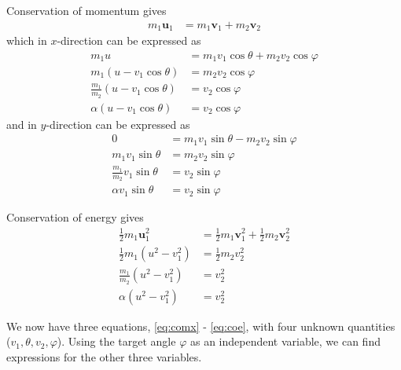 \documentclass[twoside,english]{uiofysmaster/uiofysmaster}
\let\orgautoref\autoref
\renewcommand{\autoref}
        {%
		 \def\sectionautorefname{Section}%
		 \def\subsectionautorefname{Section}%
		 \def\subsubsectionautorefname{Section}%
		 \def\chapterautorefname{Chapter}%
          \orgautoref}
\begin{document}
\begin{appendices}
Conservation of momentum gives
\begin{align*}%
	m_1 \boldsymbol{u}_1 &= m_1 \boldsymbol{v}_1 + m_2 \boldsymbol{v}_2
\end{align*}
which in $x$-direction can be expressed as
\begin{align}\label{eq:comx}
	m_1 u &= m_1 v_1 \cos \theta + m_2 v_2 \cos \varphi  \nonumber\\
	m_1 (u - v_1 \cos \theta) &= m_2 v_2 \cos \varphi  \nonumber\\
	\frac{m_1}{m_2} (u - v_1 \cos \theta) &= v_2 \cos \varphi  \nonumber\\
	\alpha (u - v_1 \cos \theta) &= v_2 \cos \varphi
\end{align}
and in $y$-direction can be expressed as
\begin{align}\label{eq:comy}
	0 &= m_1 v_1 \sin \theta - m_2 v_2 \sin \varphi \nonumber\\
	m_1 v_1 \sin \theta &= m_2 v_2 \sin \varphi \nonumber\\
	\frac{m_1}{m_2} v_1 \sin \theta &= v_2 \sin \varphi \nonumber\\
	\alpha v_1 \sin \theta &= v_2 \sin \varphi
\end{align}

Conservation of energy gives
\begin{align}\label{eq:coe}
	\tfrac{1}{2} m_1 \boldsymbol{u}_1^2 &= \tfrac{1}{2} m_1 \boldsymbol{v}_1^2 + \tfrac{1}{2} m_2 \boldsymbol{v}_2^2 \nonumber\\
	\tfrac{1}{2} m_1 (u^2 - v_1^2) &= \tfrac{1}{2} m_2 v_2^2 \nonumber\\
	\frac{m_1}{m_2} (u^2 - v_1^2) &= v_2^2 \nonumber\\
	\alpha (u^2 - v_1^2) &= v_2^2
\end{align}

We now have three equations, \autoref{eq:comx} - \autoref{eq:coe}, with four unknown quantities ($v_1, \theta, v_2, \varphi$). 
Using the target angle $\varphi$ as an independent variable, we can find expressions for the other three variables. 


\end{appendices}
\end{document}
